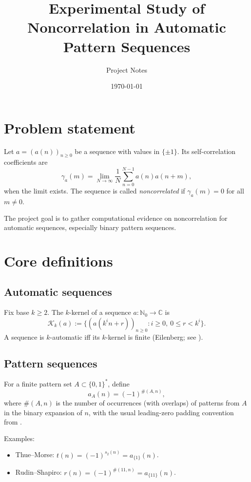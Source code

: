 \documentclass[11pt]{article}
\title{Experimental Study of Noncorrelation in Automatic Pattern Sequences}
\author{Project Notes}
\date{\today}
\begin{document}
\maketitle

\section{Problem statement}
Let $a=(a(n))_{n\ge 0}$ be a sequence with values in $\{\pm 1\}$. Its self-correlation coefficients are
\[
\gamma_a(m) = \lim_{N\to\infty}\frac1N\sum_{n=0}^{N-1}a(n)a(n+m),
\]
when the limit exists. The sequence is called \emph{noncorrelated} if $\gamma_a(m)=0$ for all $m\neq 0$.

The project goal is to gather computational evidence on noncorrelation for automatic sequences, especially binary pattern sequences.

\section{Core definitions}
\subsection*{Automatic sequences}
Fix base $k\ge 2$. The $k$-kernel of a sequence $a:\mathbb{N}_0\to \mathbb{C}$ is
\[
\mathcal{K}_k(a):=\{(a(k^i n+r))_{n\ge 0}: i\ge 0,\ 0\le r<k^i\}.
\]
A sequence is $k$-automatic iff its $k$-kernel is finite (Eilenberg; see \cite{AS03}).

\subsection*{Pattern sequences}
For a finite pattern set $A\subset \{0,1\}^*$, define
\[
a_A(n)=(-1)^{\#(A,n)},
\]
where $\#(A,n)$ is the number of occurrences (with overlaps) of patterns from $A$ in the binary expansion of $n$, with the usual leading-zero padding convention from \cite{Kon21}.

Examples:
\begin{itemize}
  \item Thue--Morse: $t(n)=(-1)^{s_2(n)}=a_{\{1\}}(n)$.
  \item Rudin--Shapiro: $r(n)=(-1)^{\#(11,n)}=a_{\{11\}}(n)$.
\end{itemize}
\end{document}
